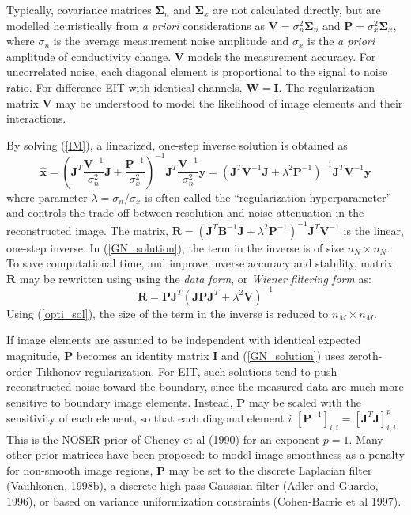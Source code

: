 \documentclass[12pt]{iopart}
\newcommand{\xH}{\mbox{$\mathbf{\hat x}$}}
\newcommand{\yB}{\mbox{$\mathbf{y}$}}
\newcommand{\BB}{\mbox{$\mathbf{B}$}}
\newcommand{\RB}{\mbox{$\mathbf{R}$}}
\newcommand{\IB}{\mbox{$\mathbf{I}$}}
\newcommand{\JB}{\mbox{$\mathbf{J}$}}
\renewcommand{\PB}{\mbox{$\mathbf{P}$}}
\newcommand{\VB}{\mbox{$\mathbf{V}$}}
\newcommand{\WB}{\mbox{$\mathbf{W}$}}
\newcommand{\SG}{\mbox{${\mathbf \Sigma}$}}
\begin{document}
Typically,  covariance matrices
$\SG_n$ and $\SG_x$ are not calculated directly, but
are modelled heuristically from {\em a priori}
considerations as 
 $\VB = \sigma_n^{2}\SG_n$
 and
 $\PB = \sigma_x^{2}\SG_x$,
where $\sigma_n$ is the average measurement noise amplitude and
$\sigma_x$ is the {\em a priori} amplitude of conductivity change.
$\VB$ models the measurement accuracy. For uncorrelated noise,
each diagonal element is proportional to the signal to noise
ratio. For difference EIT with identical channels, $\WB=\IB$. The
regularization matrix $\VB$ may be understood to model the
likelihood of image elements and their interactions.

By solving (\ref{IM}), a linearized, one-step inverse solution is
obtained as
\begin{equation}\label{GN_solution}
\xH=\left(
    \JB^T \frac{\VB^{-1}}{\sigma_n^2} \JB 
     +
    \frac{\PB^{-1}}{\sigma_x^2} 
    \right)^{-1}
    \JB^T \frac{\VB^{-1}}{\sigma_n^2}\yB
   =\left(
    \JB^T \VB^{-1} \JB + \lambda^2 \PB^{-1}
    \right)^{-1}
    \JB^T \VB^{-1} \yB
\end{equation}
where parameter  $\lambda=\sigma_n/\sigma_x$ is
often called the ``regularization hyperparameter'' and
controls the trade-off
between resolution and noise attenuation in the reconstructed
image.
The matrix,
$\RB=\left(\JB^T\BB^{-1}\JB+\lambda^2\PB^{-1}\right)^{-1}\JB^T\VB^{-1}$
is the linear, one-step inverse.
In (\ref{GN_solution}), the term in the inverse is of size
$n_N\times n_N$. To save computational time, and improve inverse
accuracy and stability, matrix $\RB$ may be rewritten using
using the {\em data form}, or {\em Wiener filtering form} as:
\begin{equation}\label{opti_sol}
 \RB =\PB\JB^T
    \left(
       \JB\PB\JB^T+\lambda^2\VB
   \right)^{-1}
\end{equation}
Using (\ref{opti_sol}), the size of the term in the inverse is
reduced to $n_M\times n_M$.

If image elements are assumed to be independent with identical
expected magnitude, $\PB$ becomes an identity matrix $\IB$ and
(\ref{GN_solution}) uses zeroth-order Tikhonov regularization. For
EIT, such solutions tend to push reconstructed noise toward the
boundary, since the measured data are much more sensitive to
boundary image elements. Instead, $\PB$ may be scaled with the
sensitivity of each element, so that each diagonal element $i$ 
$[\PB^{-1}]_{i,i} = \left[ \JB^T \JB
\right]_{i,i}^p$. This is the NOSER prior of Cheney et al (1990)
for an exponent $p=1$. Many other prior matrices have been
proposed: to model image smoothness as a penalty for non-smooth
image regions, $\PB$ may be set to the discrete Laplacian filter
(Vauhkonen, 1998b), a discrete high pass Gaussian filter (Adler
and Guardo, 1996), or based on variance uniformization
constraints (Cohen-Bacrie et al 1997).
\end{document}
